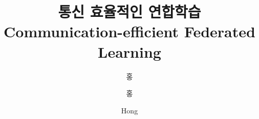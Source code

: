 \documentclass[doctor,english,final,pdfdoc]{kaist-ucs-improved}
\title[korean] {통신 효율적인 연합학습}
\title[english]{Communication-efficient Federated Learning}
\author[korean]{홍}{길 동}
\author[korean2]{홍}{길동}    %
\author[chinese]{}{} %
\author[english]{Hong}{Gildong}
\begin{document}
    
		\thesisinfo
   
   

		

    \addtocounter{pagemarker}{1}                 %
    \newpage  
  
		\iffinal
			\tableofcontents

			\listoftables

			\listoffigures
		\else
			\label{paperlastromanpagelabel} %
		\fi
\end{document}
